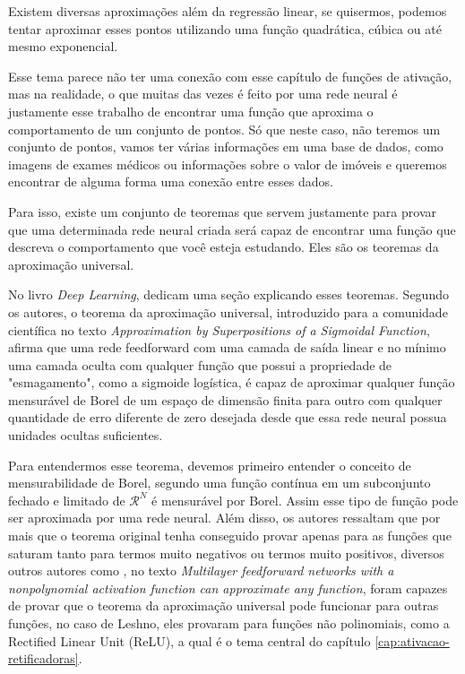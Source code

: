 Existem diversas aproximações além da regressão linear, se quisermos, podemos tentar aproximar esses pontos utilizando uma função quadrática, cúbica ou até mesmo exponencial.

Esse tema parece não ter uma conexão com esse capítulo de funções de ativação, mas na realidade, o que muitas das vezes é feito por uma rede neural é justamente esse trabalho de encontrar uma função que aproxima o comportamento de um conjunto de pontos. Só que neste caso, não teremos um conjunto de pontos, vamos ter várias informações em uma base de dados, como imagens de exames médicos ou informações sobre o valor de imóveis e queremos encontrar de alguma forma uma conexão entre esses dados.

Para isso, existe um conjunto de teoremas que servem justamente para provar que uma determinada rede neural criada será capaz de encontrar uma função que descreva o comportamento que você esteja estudando. Eles são os teoremas da aproximação universal.

No livro \textit{Deep Learning}, \textcite{DeepLearningBook} dedicam uma seção explicando esses teoremas. Segundo os autores, o teorema da aproximação universal, introduzido \textcite{Cybenko1989} para a comunidade científica no texto \textit{Approximation by Superpositions of a Sigmoidal Function}, afirma que uma rede feedforward com uma camada de saída linear e no mínimo uma camada oculta com qualquer função que possui a propriedade de "esmagamento", como a sigmoide logística, é capaz de aproximar qualquer função mensurável de Borel de um espaço de dimensão finita para outro com qualquer quantidade de erro diferente de zero desejada desde que essa rede neural possua unidades ocultas suficientes.

Para entendermos esse teorema, devemos primeiro entender o conceito de mensurabilidade de Borel, segundo \textcite{DeepLearningBook} uma função contínua em um subconjunto fechado e limitado de $\mathcal{R}^N$ é mensurável por Borel. Assim esse tipo de função pode ser aproximada por uma rede neural. Além disso, os autores ressaltam que por mais que o teorema original tenha conseguido provar apenas para as funções que saturam tanto para termos muito negativos ou termos muito positivos, diversos outros autores como \textcite{Leshno1993}, no texto \textit{Multilayer feedforward networks with a nonpolynomial activation function can approximate any function}, foram capazes de provar que o teorema da aproximação universal pode funcionar para outras funções, no caso de Leshno, eles provaram para funções não polinomiais, como a Rectified Linear Unit (ReLU), a qual é o tema central do capítulo \ref{cap:ativacao-retificadoras}.

